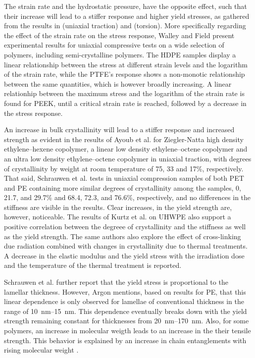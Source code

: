 The strain rate and the hydrostatic pressure, have the opposite effect, such that their increase will lead to a stiffer response and higher yield stresses, as gathered from the results in \cite{popelarViscoelasticMaterialCharacterization1990} (uniaxial traction) and \cite{trussEffectHydrostaticPressure1981} (torsion).
More specifically regarding the effect of the strain rate on the stress response, Walley and Field \citep{walleyStrainRateSensitivity1994} present experimental results for uniaxial compressive tests on a wide selection of polymers, including semi-crystalline polymers.
The HDPE samples display a linear relationship between the stress at different strain levels and the logarithm of the strain rate, while the PTFE's response shows a non-monotic relationship between the same quantities, which is however broadly increasing.
A linear relationhip between the maximum stress and the logarithm of the strain rate is found for PEEK, until a critical strain rate is reached, followed by a decrease in the stress response.

An increase in bulk crystallinity will lead to a stiffer response and increased strength as evident in the results of Ayoub et al. \citep{ayoubEffectsCrystalContent2011} for Ziegler-Natta high density ethylene–hexene copolymer, a linear low density ethylene–octene copolymer and an ultra low density ethylene–octene copolymer in uniaxial traction, with degrees of crystallinity by weight at room temperature of 75, 33 and 17\%, respectively.
That said, Schrauwen et al. \citep{schrauwenIntrinsicDeformationBehavior2004} tests in uniaxial compression samples of both PET and PE containing more similar degrees of crystallinity among the samples, 0, 21.7, and 29.7\% and 68.4, 72.3, and 76.6\%, respectively, and no differences in the stiffness are visible in the results.
Clear increases, in the yield strength are, however, noticeable.
The results of Kurtz et al. \citep{kurtzThermomechanicalBehaviorVirgin2002} on UHWPE also support a positive correlation between the degreee of crystallinity and the stiffness as well as the yield strength.
The same authors \citep{kurtzMiniatureSpecimenMechanical1999, kurtzThermomechanicalBehaviorVirgin2002} also explore the effect of cross-linking due radiation combined with changes in crystallinity due to thermal treatments.
A decrease in the elastic modulus and the yield stress with the irradiation dose and the temperature of the thermal treatment is reported.

Schrauwen et al. \citep{schrauwenIntrinsicDeformationBehavior2004} further report that the yield stress is proportional to the lamellar thickness.
However, Argon \citep{argonPhysicsDeformationFracture2013a} mentions, based on results for PE, that this linear dependence is only observed for lamellae of conventional thickness in the range of \SIrange{10}{15}{\nano\meter}.
This dependence eventually breaks down with the yield strength remaining constant for thicknesses from \SIrange{20}{170}{\nano\meter}.
Also, for some polymers, an increase in molecular weigth leads to an increase in the their tensile strength.
This behavior is explained by an increase in chain entanglements with rising molecular weight \citep{callister2014materials}.

